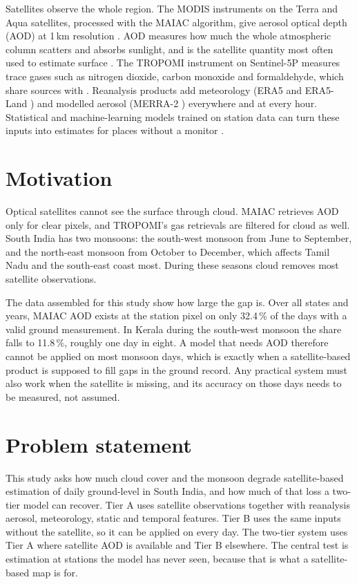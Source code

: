 Satellites observe the whole region. The MODIS instruments on the Terra and Aqua satellites,
processed with the MAIAC algorithm, give aerosol optical depth (AOD) at 1\,km resolution
\cite{lyapustin2018maiac}. AOD measures how much the whole atmospheric column scatters and absorbs
sunlight, and is the satellite quantity most often used to estimate surface \pmtf{}. The TROPOMI
instrument on Sentinel-5P measures trace gases such as nitrogen dioxide, carbon monoxide and
formaldehyde, which share sources with \pmtf{} \cite{veefkind2012tropomi}. Reanalysis products add
meteorology (ERA5 and ERA5-Land \cite{hersbach2020era5,munozsabater2021era5land}) and modelled
aerosol (MERRA-2 \cite{gelaro2017merra2}) everywhere and at every hour. Statistical and
machine-learning models trained on station data can turn these inputs into \pmtf{} estimates for
places without a monitor \cite{dey2020india,kawano2025india}.

\section{Motivation}

Optical satellites cannot see the surface through cloud. MAIAC retrieves AOD only for clear
pixels, and TROPOMI's gas retrievals are filtered for cloud as well. South India has two monsoons:
the south-west monsoon from June to September, and the north-east monsoon from October to
December, which affects Tamil Nadu and the south-east coast most. During these seasons cloud
removes most satellite observations.

The data assembled for this study show how large the gap is. Over all states and years, MAIAC AOD
exists at the station pixel on only 32.4\,\% of the days with a valid ground measurement. In
Kerala during the south-west monsoon the share falls to 11.8\,\%, roughly one day in eight. A model
that needs AOD therefore cannot be applied on most monsoon days, which is exactly when a
satellite-based product is supposed to fill gaps in the ground record. Any practical system must
also work when the satellite is missing, and its accuracy on those days needs to be measured, not
assumed.

\section{Problem statement}

This study asks how much cloud cover and the monsoon degrade satellite-based estimation of daily
ground-level \pmtf{} in South India, and how much of that loss a two-tier model can recover. Tier A
uses satellite observations together with reanalysis aerosol, meteorology, static and temporal
features. Tier B uses the same inputs without the satellite, so it can be applied on every day.
The two-tier system uses Tier A where satellite AOD is available and Tier B elsewhere. The central
test is estimation at stations the model has never seen, because that is what a satellite-based
map is for.

